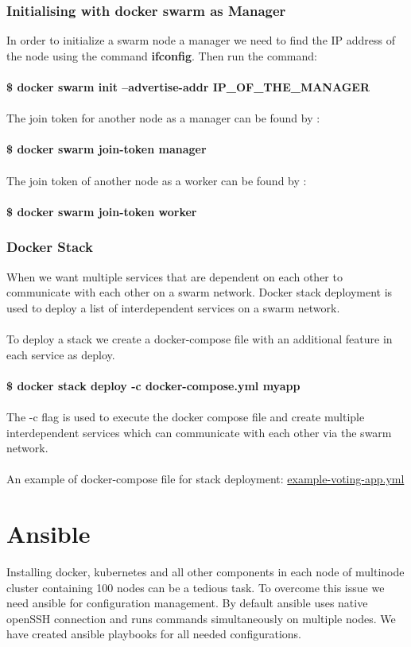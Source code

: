 \documentclass[12pt]{article}
\begin{document}
\subsubsection{Initialising with docker swarm as Manager}
In order to initialize a swarm node a manager we need to find the IP address of  the node using the command \textbf{ifconfig}. Then run the command:\\\\
\textbf{\$ docker swarm init --advertise-addr IP\_OF\_THE\_MANAGER}\\\\
The join token for another node as a manager can be found by :\\\\
\textbf{\$ docker swarm join-token manager\\\\}
The join token of another node as a worker can be found by :\\\\
\textbf{\$ docker swarm join-token worker}
\subsubsection{Docker Stack}
When we want multiple services that are dependent on each other to communicate with each other on a swarm network. Docker stack deployment is used to deploy a list of interdependent services on a swarm network.\\\\
To deploy a stack we create a docker-compose file with an additional feature in each service as deploy.\\\\
\textbf{\$ docker stack deploy -c docker-compose.yml myapp}\\\\
The -c flag is used to execute the docker compose file and create multiple interdependent services which can communicate with each other via the swarm network.\\\\
An example of docker-compose file for stack deployment: \href{https://drive.google.com/file/d/1t3MwMzXrjDNgrXTeLmwiEe5Hj0q6pueq/view?usp=sharing}{example-voting-app.yml}
\section{Ansible}
Installing docker, kubernetes and all other components in each node of multinode cluster containing 100 nodes can be a tedious task. To overcome this issue we need ansible for configuration management. By default ansible uses native openSSH connection and runs commands simultaneously on multiple nodes. We have created ansible playbooks for all needed configurations.
\end{document}

